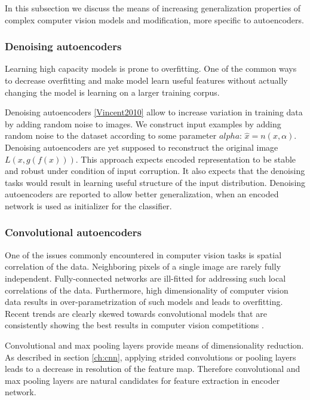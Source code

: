 In this subsection we discuss the means of increasing generalization properties of complex computer vision models and modification, more specific to autoencoders.

\subsubsection{Denoising autoencoders}\label{ch:denae}

Learning high capacity models is prone to overfitting.
One of the common ways to decrease overfitting and make model learn useful features without actually changing the model is learning on a larger training corpus.

Denoising autoencoders \ref{Vincent2010} allow to increase variation in training data by adding random noise to images. We construct input examples by adding random noise to the dataset according to some parameter $alpha$: $\hat{x}=n(x, \alpha)$.
Denoising autoencoders are yet supposed to reconstruct  the original image $L(x, g(f(x)))$.
This approach expects encoded representation to be stable and robust under condition of input corruption.
It also expects that the denoising tasks would result in learning useful structure of the input distribution.
Denoising autoencoders are reported to allow better generalization, when an encoded network is used as initializer for the classifier.

\subsubsection{Convolutional autoencoders}\label{ch:cae}

One of the issues commonly encountered in computer vision tasks is spatial correlation of the data.
Neighboring pixels of a single image are rarely fully independent.
Fully-connected networks are ill-fitted for addressing such local correlations of the data.
Furthermore, high dimensionality of computer vision data results in over-parametrization of such models and leads to overfitting.
Recent trends are clearly skewed towards convolutional models \cite{He2015, Szegedy2016} that are consistently showing the best results in computer vision competitions \cite{ILSVRC15, Zhou2016}.

Convolutional and max pooling layers provide means of dimensionality reduction.
As described in section \ref{ch:cnn}, applying strided convolutions or pooling layers leads to a decrease in resolution of the feature map.
Therefore convolutional and max pooling layers are natural candidates for feature extraction in encoder network.

